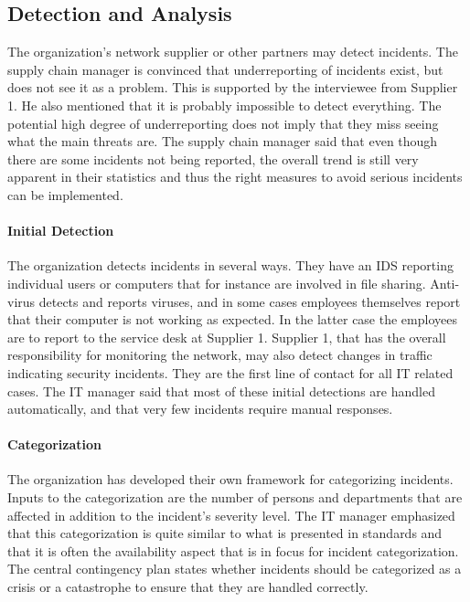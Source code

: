 \documentclass[b5paper, twoside, openright, 11pt]{report}
\begin{document}
\subsection{Detection and Analysis}
The organization's network supplier or other partners may detect incidents. The supply chain manager is convinced that underreporting of incidents exist, but does not see it as a problem. This is supported by the interviewee from Supplier 1. He also mentioned that it is probably impossible to detect everything. The potential high degree of underreporting does not imply that they miss seeing what the main threats are. The supply chain manager said that even though there are some incidents not being reported, the overall trend is still very apparent in their statistics and thus the right measures to avoid serious incidents can be implemented. 

\paragraph{Initial Detection}
The organization detects incidents in several ways. They have an \ac{IDS} reporting individual users or computers that for instance are involved in file sharing. Anti-virus detects and reports viruses, and in some cases employees themselves report that their computer is not working as expected. In the latter case the employees are to report to the service desk at Supplier 1. Supplier 1, that has the overall responsibility for monitoring the network, may also detect changes in traffic indicating security incidents. They are the first line of contact for all IT related cases. The IT manager said that most of these initial detections are handled automatically, and that very few incidents require manual responses. 

\paragraph{Categorization}
The organization has developed their own framework for categorizing incidents. Inputs to the categorization are the number of persons and departments that are affected in addition to the incident's severity level. The IT manager emphasized that this categorization is quite similar to what is presented in standards and that it is often the availability aspect that is in focus for incident categorization. The central contingency plan states whether incidents should be categorized as a crisis or a catastrophe to ensure that they are handled correctly.
\end{document}
